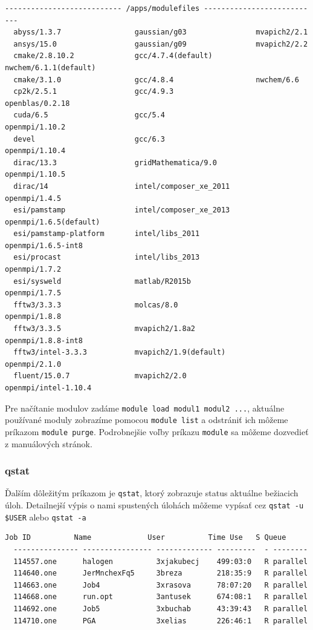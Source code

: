 \begin{lstlisting}[caption={module avail}]
  --------------------------- /apps/modulefiles ---------------------------
  abyss/1.3.7                 gaussian/g03                mvapich2/2.1
  ansys/15.0                  gaussian/g09                mvapich2/2.2
  cmake/2.8.10.2              gcc/4.7.4(default)          nwchem/6.1.1(default)
  cmake/3.1.0                 gcc/4.8.4                   nwchem/6.6
  cp2k/2.5.1                  gcc/4.9.3                   openblas/0.2.18
  cuda/6.5                    gcc/5.4                     openmpi/1.10.2
  devel                       gcc/6.3                     openmpi/1.10.4
  dirac/13.3                  gridMathematica/9.0         openmpi/1.10.5
  dirac/14                    intel/composer_xe_2011      openmpi/1.4.5
  esi/pamstamp                intel/composer_xe_2013      openmpi/1.6.5(default)
  esi/pamstamp-platform       intel/libs_2011             openmpi/1.6.5-int8
  esi/procast                 intel/libs_2013             openmpi/1.7.2
  esi/sysweld                 matlab/R2015b               openmpi/1.7.5
  fftw3/3.3.3                 molcas/8.0                  openmpi/1.8.8
  fftw3/3.3.5                 mvapich2/1.8a2              openmpi/1.8.8-int8
  fftw3/intel-3.3.3           mvapich2/1.9(default)       openmpi/2.1.0
  fluent/15.0.7               mvapich2/2.0                openmpi/intel-1.10.4
\end{lstlisting}

Pre načítanie modulov zadáme \texttt{module load modul1 modul2 ...}, aktuálne používané moduly zobrazíme pomocou
\texttt{module list} a odstrániť ich môžeme príkazom \texttt{module purge}.
Podrobnejšie voľby príkazu \texttt{module} sa môžeme dozvedieť z manuálových stránok.

\subsubsection{qstat}
Ďalším dôležitým príkazom je \texttt{qstat}, ktorý zobrazuje status aktuálne bežiacich úloh.
Detailnejší výpis o nami spustených úlohách môžeme vypísať cez \texttt{qstat -u \$USER} alebo \texttt{qstat -a}

\begin{lstlisting}[caption={qstat}]
  Job ID          Name             User          Time Use   S Queue
  --------------- ---------------- ------------- ---------  - --------
  114557.one      halogen          3xjakubecj    499:03:0   R parallel
  114640.one      JerMnchexFq5     3breza        218:35:9   R parallel
  114663.one      Job4             3xrasova      78:07:20   R parallel
  114668.one      run.opt          3antusek      674:08:1   R parallel
  114692.one      Job5             3xbuchab      43:39:43   R parallel
  114710.one      PGA              3xelias       226:46:1   R parallel
\end{lstlisting}

